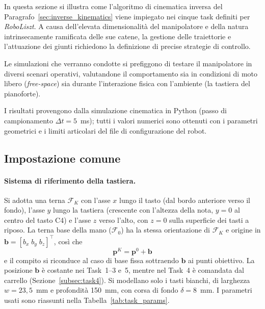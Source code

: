 In questa sezione si illustra come l'algoritmo di cinematica inversa del Paragrafo~\ref{sec:inverse_kinematics} viene impiegato nei cinque task definiti per \textit{RoboLiszt}. 
A causa dell'elevata dimensionalità del manipolatore e della natura intrinsecamente ramificata delle sue catene, la gestione delle traiettorie e l'attuazione dei giunti richiedono la definizione di precise strategie di controllo.

Le simulazioni che verranno condotte si prefiggono di testare il manipolatore in diversi scenari operativi, valutandone il comportamento sia in condizioni di moto libero (\textit{free-space}) sia durante l'interazione fisica con l'ambiente (la tastiera del pianoforte).

I risultati provengono dalla simulazione cinematica in Python (passo di campionamento $\Delta t=5$~ms); tutti i valori numerici sono ottenuti con i parametri geometrici e i limiti articolari del file di configurazione del robot.

\subsection{Impostazione comune}

\paragraph{Sistema di riferimento della tastiera.} Si adotta una terna $\mathcal F_K$ con l'asse $x$ lungo il tasto (dal bordo anteriore verso il fondo), l'asse $y$ lungo la tastiera (crescente con l'altezza della nota, $y=0$ al centro del tasto C4) e l'asse $z$ verso l'alto, con $z=0$ sulla superficie dei tasti a riposo. La terna base della mano ($\mathcal F_0$) ha la stessa orientazione di $\mathcal F_K$ e origine in $\boldsymbol b=[b_x\; b_y\; b_z]^\top$, così che
\begin{equation}
    \boldsymbol p^{K}=\boldsymbol p^{0}+\boldsymbol b
    \label{eq:base_shift}
\end{equation}
e il compito si riconduce al caso di base fissa sottraendo $\boldsymbol b$ ai punti obiettivo. La posizione $\boldsymbol b$ è costante nei Task~1--3 e~5, mentre nel Task~4 è comandata dal carrello (Sezione~\ref{subsec:task4}). Si modellano solo i tasti bianchi, di larghezza $w=23{,}5$~mm e profondità 150~mm, con corsa di fondo $\delta=8$~mm. I parametri usati sono riassunti nella Tabella~\ref{tab:task_params}.

